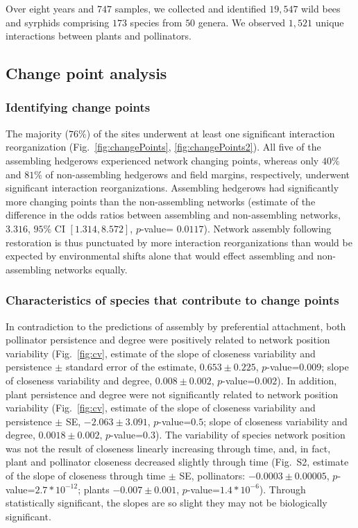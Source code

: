 \documentclass[12pt]{article}
\begin{document}
Over eight years and $747$ samples, we collected and identified
$19,547$ wild bees and syrphids comprising $173$ species from $50$
genera. We observed $1,521$ unique interactions between plants and
pollinators.

\subsection*{Change point analysis}
\subsubsection*{Identifying change points}

The majority ($76\%$) of the sites underwent at least one significant
interaction reorganization (Fig.~\ref{fig:changePoints},
\ref{fig:changePoints2}).  All five of the assembling hedgerows
experienced network changing points, whereas only $40\%$ and $81\%$ of
non-assembling hedgerows and field margins, respectively, underwent
significant interaction reorganizations. Assembling hedgerows had
significantly more changing points than the non-assembling networks
(estimate of the difference in the odds ratios between assembling and
non-assembling networks, $3.316$, $95\%$ CI $[1.314, 8.572]$,
$p$-value= $0.0117$). Network assembly following restoration is thus
punctuated by more interaction reorganizations than would be expected
by environmental shifts alone that would effect assembling and
non-assembling networks equally.

\subsubsection*{Characteristics of species that contribute to change
  points}

In contradiction to the predictions of assembly by preferential
attachment, both pollinator persistence and degree were positively
related to network position variability (Fig.~\ref{fig:cv}, estimate
of the slope of closeness variability and persistence $\pm$ standard
error of the estimate, $0.653 \pm 0.225$, $p$-value=$0.009$; slope of
closeness variability and degree, $0.008 \pm 0.002$,
$p$-value=$0.002$). In addition, plant persistence and degree were not
significantly related to network position variability
(Fig.~\ref{fig:cv}, estimate of the slope of closeness variability and
persistence $\pm$ SE, $-2.063 \pm 3.091$,
$p$-value=$0.5$; slope of closeness variability and degree, $0.0018
\pm 0.002$, $p$-value=$0.3$). The variability of species network
position was not the result of closeness linearly increasing through
time, and, in fact, plant and pollinator closeness decreased slightly
through time (Fig.~S2, estimate of the slope of closeness through time
$\pm$ SE, pollinators: $-0.0003 \pm
0.00005$, $p$-value=$2.7*10^{-12}$; plants $-0.007 \pm 0.001$,
$p$-value=$1.4*10^{-6}$). Through statistically significant, the
slopes are so slight they may not be biologically significant.
\end{document}
